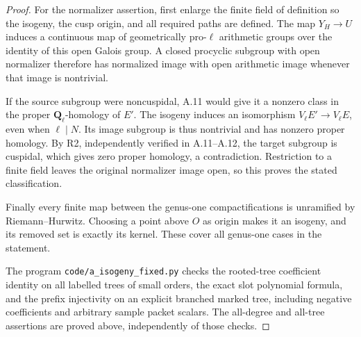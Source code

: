 \begin{proof}
For the normalizer assertion, first enlarge the
finite field of definition so the isogeny, the
cusp origin, and all required paths are defined.
The map \(Y_H\to U\) induces a continuous map
of geometrically pro-\(\ell\) arithmetic groups
over the identity of this open Galois group. A
closed procyclic subgroup with open normalizer
therefore has normalized image with open arithmetic
image whenever that image is nontrivial.

If the source subgroup were noncuspidal, A.11
would give it a nonzero class in the proper
\(\mathbf Q_\ell\)-homology of \(E'\). The
isogeny induces an isomorphism
\(V_\ell E'\to V_\ell E\), even when
\(\ell\mid N\). Its image subgroup is thus
nontrivial and has nonzero proper homology.
By R2, independently verified in A.11--A.12,
the target subgroup is cuspidal, which gives
zero proper homology, a contradiction. Restriction
to a finite field leaves the original normalizer
image open, so this proves the stated classification.

Finally every finite map between the genus-one
compactifications is unramified by Riemann--Hurwitz.
Choosing a point above \(O\) as origin makes it
an isogeny, and its removed set is exactly its
kernel. These cover all genus-one cases in the
statement.

The program \texttt{code/a\_isogeny\_fixed.py}
checks the rooted-tree coefficient identity on
all labelled trees of small orders, the exact
slot polynomial formula, and the prefix injectivity
on an explicit branched marked tree, including
negative coefficients and arbitrary sample packet
scalars. The all-degree and all-tree assertions
are proved above, independently of those checks.
\end{proof}
